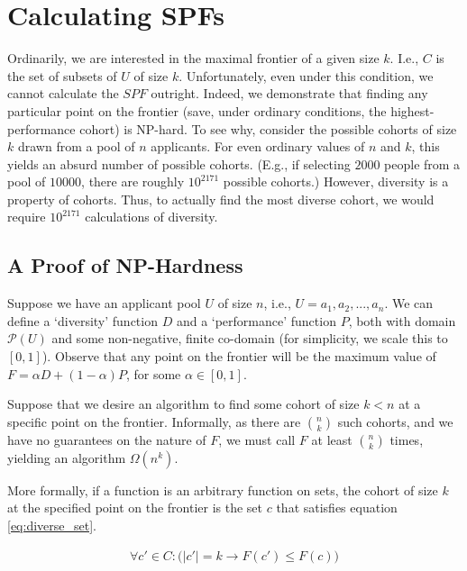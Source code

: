 \section{Calculating SPFs}\label{sec:spf_alg}
Ordinarily, we are interested in the maximal frontier of a given size $k$. I.e., $C$ is the set of subsets of $U$ of size $k$. Unfortunately, even under this condition, we cannot calculate the $SPF$ outright. Indeed, we demonstrate that finding any particular point on the frontier (save, under ordinary conditions, the highest-performance cohort) is NP-hard. To see why, consider the possible cohorts of size $k$ drawn from a pool of $n$ applicants. For even ordinary values of $n$ and $k$, this yields an absurd number of possible cohorts. (E.g., if selecting $2000$ people from a pool of $10000$, there are roughly $10^{2171}$ possible cohorts.) However, diversity is a property of cohorts. Thus, to actually find the most diverse cohort, we would require $10^{2171}$ calculations of diversity.

\subsection{A Proof of NP-Hardness}
Suppose we have an applicant pool $U$ of size $n$, i.e., $U = {a_1, a_2, ..., a_n}$. We can define a `diversity' function $D$ and a `performance' function $P$, both with domain $\mathcal{P} (U)$ and some non-negative, finite co-domain (for simplicity, we scale this to $[0, 1]$). Observe that any point on the frontier will be the maximum value of $F = \alpha D + (1 - \alpha) P$, for some $\alpha \in [0, 1]$.

Suppose that we desire an algorithm to find some cohort of size $k < n$ at a specific point on the frontier. Informally, as there are $n \choose k$ such cohorts, and we have no guarantees on the nature of $F$, we must call $F$ at least $n \choose k$ times, yielding an algorithm $\Omega(n^k)$.

More formally, if a function is an arbitrary function on sets, the cohort of size $k$ at the specified point on the frontier is the set $c$ that satisfies equation \ref{eq:diverse_set}. 

\begin{equation}
    \label{eq:diverse_set}
    \begin{split}
        \forall c' \in C : \bigl( |c'| = k \rightarrow  F(c') \leq F(c) \bigr)
    \end{split}
\end{equation}


